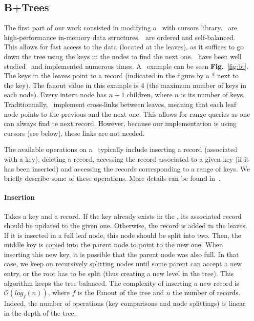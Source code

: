 \subsection{B+Trees}
The first part of our work consisted in modifying a \btrees\ with cursors library.
\btrees\ are high-performance in-memory data structures. \btrees\ are ordered and self-balanced.
This allows for fast access to the data (located at the leaves), as it suffices to go down the tree using the keys in the nodes to find the next one.
\btrees\ have been well studied~\cite{dbms} and implemented numerous times. %
A \btree\ example can be seen \textbf{Fig.}~\ref{fig:bt}.
The keys in the leaves point to a record (indicated in the figure by a * next to the key).
The fanout value in this example is 4 (the maximum number of keys in each node).
Every intern node has $n+1$ children, where $n$ is its number of keys.
Traditionnally, \btrees\ implement cross-links between leaves, meaning that each leaf node points to the previous and the next one.
This allows for range queries as one can always find te next record.
However, because our implementation is using cursors (see below), these links are not needed.

The available operations on a \btree\ typically include inserting a record (associated with a key), deleting a record, accessing the record associated to a given key (if it has been inserted) and accessing the records corresponding to a range of keys.
We briefly describe some of these operations. More details can be found in~\cite{dbms}.
\paragraph{Insertion} Takes a key and a record.
If the key already exists in the \btree, its associated record should be updated to the given one. Otherwise, the record is added in the leaves.
If it is inserted in a full leaf node, this node should be split into two. Then, the middle key is copied into the parent node to point to the new one.
When inserting this new key, it is possible that the parent node was also full.
In that case, we keep on recursively splitting nodes until some parent can accept a new entry, or the root has to be split (thus creating a new level in the tree).
This algorithm keeps the tree balanced.
The complexity of inserting a new record is $\mathcal{O}(log_{f}(n))$, where $f$ is the Fanout of the tree and $n$ the number of records.
Indeed, the number of operations (key comparisons and node splittings) is linear in the depth of the tree.

